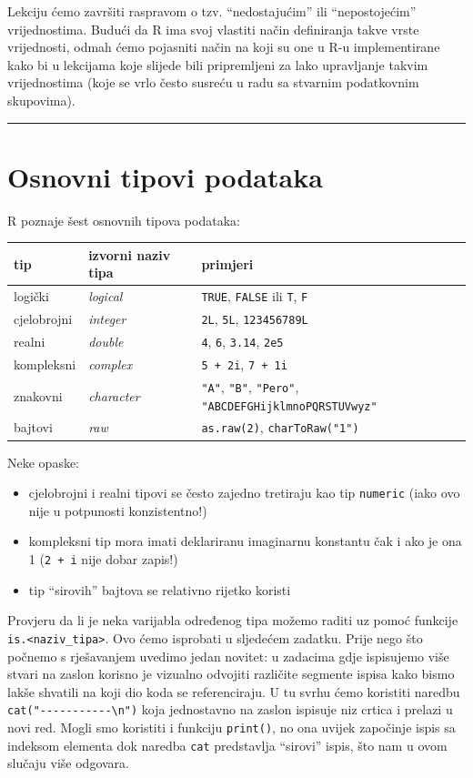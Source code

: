 \documentclass[]{book}
\providecommand{\tightlist}{%
  \setlength{\itemsep}{0pt}\setlength{\parskip}{0pt}}
\theoremstyle{definition}
\theoremstyle{definition}
\theoremstyle{definition}
\theoremstyle{remark}
\begin{document}
Lekciju ćemo završiti raspravom o tzv. ``nedostajućim'' ili
``nepostojećim'' vrijednostima. Budući da R ima svoj vlastiti način
definiranja takve vrste vrijednosti, odmah ćemo pojasniti način na koji
su one u R-u implementirane kako bi u lekcijama koje slijede bili
pripremljeni za lako upravljanje takvim vrijednostima (koje se vrlo
često susreću u radu sa stvarnim podatkovnim skupovima).

\begin{center}\rule{0.5\linewidth}{\linethickness}\end{center}

\section{Osnovni tipovi podataka}\label{osnovni-tipovi-podataka}

R poznaje šest osnovnih tipova podataka:

\begin{longtable}[]{@{}lll@{}}
\toprule
tip & izvorni naziv tipa & primjeri\tabularnewline
\midrule
\endhead
logički & \emph{logical} & \texttt{TRUE}, \texttt{FALSE} ili \texttt{T},
\texttt{F}\tabularnewline
cjelobrojni & \emph{integer} & \texttt{2L}, \texttt{5L},
\texttt{123456789L}\tabularnewline
realni & \emph{double} & \texttt{4}, \texttt{6}, \texttt{3.14},
\texttt{2e5}\tabularnewline
kompleksni & \emph{complex} & \texttt{5\ +\ 2i},
\texttt{7\ +\ 1i}\tabularnewline
znakovni & \emph{character} & \texttt{"A"}, \texttt{"B"},
\texttt{"Pero"}, \texttt{"ABCDEFGHijklmnoPQRSTUVwyz"}\tabularnewline
bajtovi & \emph{raw} & \texttt{as.raw(2)},
\texttt{charToRaw("1")}\tabularnewline
\bottomrule
\end{longtable}

Neke opaske:

\begin{itemize}
\tightlist
\item
  cjelobrojni i realni tipovi se često zajedno tretiraju kao tip
  \texttt{numeric} (iako ovo nije u potpunosti konzistentno!)
\item
  kompleksni tip mora imati deklariranu imaginarnu konstantu čak i ako
  je ona 1 (\texttt{2\ +\ i} nije dobar zapis!)
\item
  tip ``sirovih'' bajtova se relativno rijetko koristi
\end{itemize}

Provjeru da li je neka varijabla određenog tipa možemo raditi uz pomoć
funkcije \texttt{is.\textless{}naziv\_tipa\textgreater{}}. Ovo ćemo
isprobati u sljedećem zadatku. Prije nego što počnemo s rješavanjem
uvedimo jedan novitet: u zadacima gdje ispisujemo više stvari na zaslon
korisno je vizualno odvojiti različite segmente ispisa kako bismo lakše
shvatili na koji dio koda se referenciraju. U tu svrhu ćemo koristiti
naredbu \texttt{cat("-\/-\/-\/-\/-\/-\/-\/-\/-\/-\/-\textbackslash{}n")}
koja jednostavno na zaslon ispisuje niz crtica i prelazi u novi red.
Mogli smo koristiti i funkciju \texttt{print()}, no ona uvijek započinje
ispis sa indeksom elementa dok naredba \texttt{cat} predstavlja
``sirovi'' ispis, što nam u ovom slučaju više odgovara.
\end{document}
